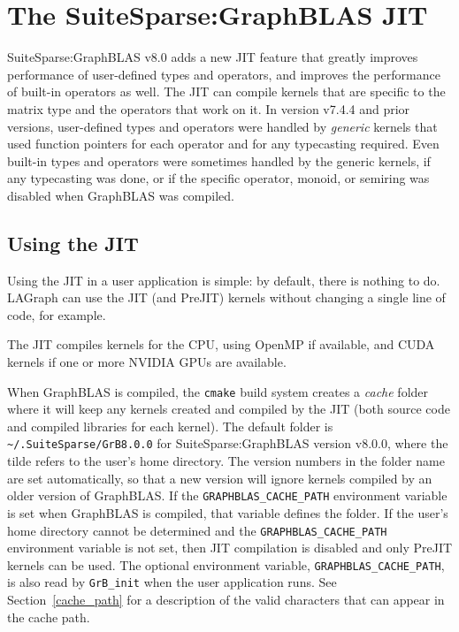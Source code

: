 

\newpage
\section{The SuiteSparse:GraphBLAS JIT} %
\label{jit}

SuiteSparse:GraphBLAS v8.0 adds a new JIT feature that greatly improves
performance of user-defined types and operators, and improves the performance
of built-in operators as well.  The JIT can compile kernels that are specific
to the matrix type and the operators that work on it.  In version v7.4.4 and
prior versions, user-defined types and operators were handled by {\em generic}
kernels that used function pointers for each operator and for any typecasting
required.  Even built-in types and operators were sometimes handled by the
generic kernels, if any typecasting was done, or if the specific operator,
monoid, or semiring was disabled when GraphBLAS was compiled.

\subsection{Using the JIT}

Using the JIT in a user application is simple:  by default, there is nothing to
do.  LAGraph can use the JIT (and PreJIT) kernels without changing a single
line of code, for example.

The JIT compiles kernels for the CPU, using OpenMP if available,
and CUDA kernels if one or more NVIDIA GPUs are available.

When GraphBLAS is compiled, the \verb'cmake' build system creates a {\em cache}
folder where it will keep any kernels created and compiled by the JIT
(both source code and compiled libraries for each kernel).  The
default folder is \verb'~/.SuiteSparse/GrB8.0.0' for SuiteSparse:GraphBLAS
version v8.0.0, where the tilde refers to the user's home directory.
The version numbers in the folder name are set automatically, so that a new
version will ignore kernels compiled by an older version of GraphBLAS.  If the
\verb'GRAPHBLAS_CACHE_PATH' environment variable is set when GraphBLAS is
compiled, that variable defines the folder.  If the user's home directory
cannot be determined and the \verb'GRAPHBLAS_CACHE_PATH' environment variable
is not set, then JIT compilation is disabled and only PreJIT kernels can be
used.  The optional environment variable, \verb'GRAPHBLAS_CACHE_PATH', is also
read by \verb'GrB_init' when the user application runs.  See
Section~\ref{cache_path} for a description of the valid characters that can
appear in the cache path.

